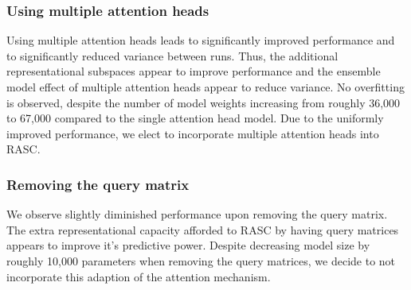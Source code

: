 
%
\subsubsection{Using multiple attention heads} \label{subsubsec:result_heads}
Using multiple attention heads leads to significantly improved performance and to significantly reduced variance between runs. Thus, the additional representational subspaces appear to improve performance and the ensemble model effect of multiple attention heads appear to reduce variance. No overfitting is observed, despite the number of model weights increasing from roughly 36,000 to 67,000 compared to the single attention head model. Due to the uniformly improved performance, we elect to incorporate multiple attention heads into RASC. 


\subsubsection{Removing the query matrix}  %
We observe slightly diminished performance upon removing the query matrix. The extra representational capacity afforded to RASC by having query matrices appears to improve it's predictive power. Despite decreasing model size by roughly 10,000 parameters when removing the query matrices, we decide to not incorporate this adaption of the attention mechanism. 

